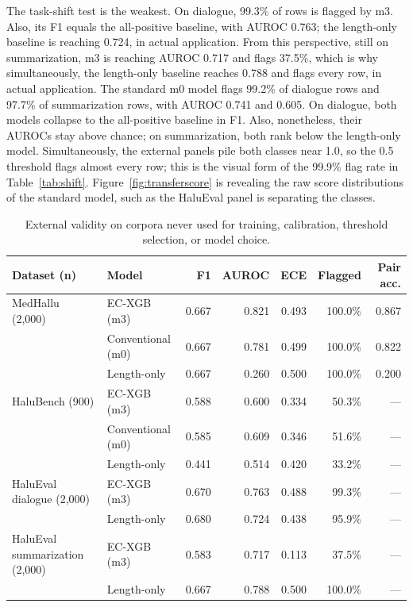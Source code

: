 \documentclass[a4paper,fleqn]{cas-sc}
\begin{document}
The task-shift test is the weakest. On dialogue, 99.3\% of rows is flagged by m3. Also, its F1 equals the all-positive baseline, with AUROC 0.763; the length-only baseline is reaching 0.724, in actual application. From this perspective, still on summarization, m3 is reaching AUROC 0.717 and flags 37.5\%, which is why simultaneously, the length-only baseline reaches 0.788 and flags every row, in actual application. The standard m0 model flags 99.2\% of dialogue rows and 97.7\% of summarization rows, with AUROC 0.741 and 0.605. On dialogue, both models collapse to the all-positive baseline in F1. Also, nonetheless, their AUROCs stay above chance; on summarization, both rank below the length-only model. Simultaneously, the external panels pile both classes near 1.0, so the 0.5 threshold flags almost every row; this is the visual form of the 99.9\% flag rate in Table~\ref{tab:shift}. Figure~\ref{fig:transferscore} is revealing the raw score distributions of the standard model, such as the HaluEval panel is separating the classes.

\begin{table}[pos=htbp]
  \centering
  \caption{External validity on corpora never used for training, calibration, threshold selection, or model choice.}
  \label{tab:external}
  \begin{tabular}{llrrrrr}
    \toprule
    \textbf{Dataset (n)} & \textbf{Model} & \textbf{F1} & \textbf{AUROC} & \textbf{ECE} & \textbf{Flagged} & \textbf{Pair acc.} \\
    \midrule
    MedHallu (2{,}000) & EC-XGB (m3) & 0.667 & 0.821 & 0.493 & 100.0\% & 0.867 \\
                       & Conventional (m0) & 0.667 & 0.781 & 0.499 & 100.0\% & 0.822 \\
                       & Length-only & 0.667 & 0.260 & 0.500 & 100.0\% & 0.200 \\
    \addlinespace
    HaluBench (900)    & EC-XGB (m3) & 0.588 & 0.600 & 0.334 & 50.3\% & --- \\
                       & Conventional (m0) & 0.585 & 0.609 & 0.346 & 51.6\% & --- \\
                       & Length-only & 0.441 & 0.514 & 0.420 & 33.2\% & --- \\
    \addlinespace
    HaluEval dialogue (2{,}000) & EC-XGB (m3) & 0.670 & 0.763 & 0.488 & 99.3\% & --- \\
                       & Length-only & 0.680 & 0.724 & 0.438 & 95.9\% & --- \\
    \addlinespace
    HaluEval summarization (2{,}000) & EC-XGB (m3) & 0.583 & 0.717 & 0.113 & 37.5\% & --- \\
                       & Length-only & 0.667 & 0.788 & 0.500 & 100.0\% & --- \\
    \bottomrule
  \end{tabular}
\end{table}
\end{document}
